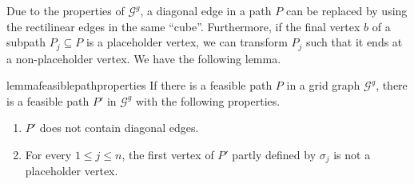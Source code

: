 \documentclass[thm-restate]{lipics-v2021}
\theoremstyle{remark}
\newcommand{\graph}[0]{\mathcal{G}}
\newcommand{\doublequote}[1]{``#1''}
\newcommand{\ggraph}[0]{\graph^g}
\begin{document}
Due to the properties of $\ggraph$, a diagonal edge in a path $P$ can be replaced by using the rectilinear edges in the same \doublequote{cube}. Furthermore, if the final vertex $b$ of a subpath $P_j \subseteq P$ is a placeholder vertex, we can transform $P_j$ such that it ends at a non-placeholder vertex. We have the following lemma. 

\begin{restatable}{lemma}{feasiblepathproperties} \label{lem:feasible-path-properties}
    If there is a feasible path $P$ in a grid graph $\ggraph$, there is a feasible path $P'$ in $\ggraph$ with the following properties. 
    \begin{enumerate}
        \item $P'$ does not contain diagonal edges. 
        \item For every $1 \leq j \leq n$, the first vertex of $P'$ partly defined by $\sigma_j$ is not a placeholder vertex.
    \end{enumerate}    
\end{restatable}
\end{document}
